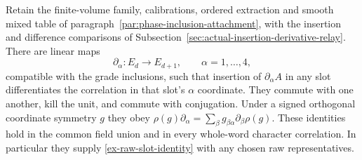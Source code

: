 \begin{proposition}
\label{prop:phase-field-derivatives}
Retain the finite-volume family, calibrations, ordered extraction and smooth
mixed table of paragraph~\ref{par:phase-inclusion-attachment}, with the
insertion and difference comparisons of
Subsection~\ref{sec:actual-insertion-derivative-relay}. There are linear maps
\[
 \partial_\alpha:E_d\longrightarrow E_{d+1},\qquad \alpha=1,\ldots,4,
\]
compatible with the grade inclusions, such that insertion of
$\partial_\alpha A$ in any slot differentiates the correlation in that
slot's $\alpha$ coordinate. They commute with one another, kill the unit,
and commute with conjugation. Under a signed orthogonal coordinate symmetry
$g$ they obey $\rho(g)\partial_\alpha=
\sum_\beta g_{\beta\alpha}\partial_\beta\rho(g)$.
These identities hold in the common field union and in every whole-word
character correlation. In particular they supply
\eqref{ex-raw-slot-identity} with any chosen raw representatives.
\end{proposition}
